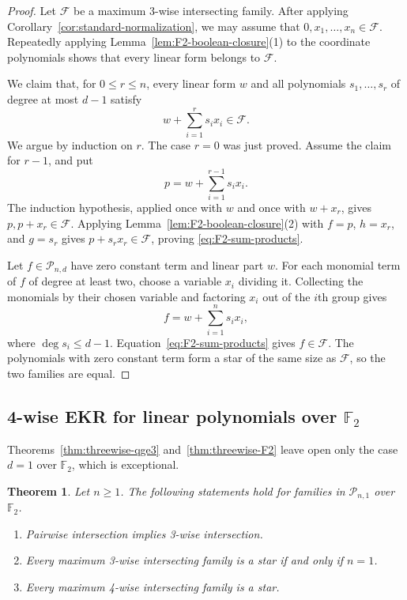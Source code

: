 \documentclass[12pt,reqno]{amsart}
\newtheorem{thm}{Theorem}[section]
\theoremstyle{definition}
\newcommand{\F}{\mathbb{F}}
\newcommand{\cF}{\mathcal F}
\newcommand{\cP}{\mathcal P}
\begin{document}
\begin{proof}
Let $\cF$ be a maximum 3-wise intersecting family. After applying
Corollary~\ref{cor:standard-normalization}, we may assume that
$0,x_1,\ldots,x_n\in\cF$. Repeatedly applying
Lemma~\ref{lem:F2-boolean-closure}\textup{(1)} to the coordinate
polynomials shows that every linear form belongs to $\cF$.

We claim that, for $0\leq r\leq n$, every linear form $w$ and all
polynomials $s_1,\ldots,s_r$ of degree at most $d-1$ satisfy
\begin{equation}\label{eq:F2-sum-products}
  w+\sum_{i=1}^r s_ix_i\in\cF.
\end{equation}
We argue by induction on $r$. The case $r=0$ was just proved. Assume
the claim for $r-1$, and put
\[
  p=w+\sum_{i=1}^{r-1}s_ix_i.
\]
The induction hypothesis, applied once with $w$ and once with
$w+x_r$, gives $p,p+x_r\in\cF$. Applying
Lemma~\ref{lem:F2-boolean-closure}\textup{(2)} with $f=p$, $h=x_r$,
and $g=s_r$ gives $p+s_rx_r\in\cF$, proving
\eqref{eq:F2-sum-products}.

Let $f\in\cP_{n,d}$ have zero constant term and linear part $w$. For each monomial term of $f$ of degree at least two, choose a variable $x_i$ dividing it. Collecting the monomials by their chosen variable and factoring $x_i$ out of the $i$th group gives
\[
  f=w+\sum_{i=1}^n s_ix_i,
\]
where $\deg s_i\leq d-1$. Equation~\eqref{eq:F2-sum-products} gives $f\in\cF$. The polynomials with zero constant term form a star of the same size as $\cF$, so the two families are equal.
\end{proof}

\subsection{4-wise EKR for linear polynomials over \texorpdfstring{$\F_2$}{F2}}
\label{subsec:affine-F2}

Theorems~\ref{thm:threewise-qge3} and~\ref{thm:threewise-F2} leave open only the case $d=1$ over $\F_2$, which is exceptional.

\begin{thm}\label{thm:affine-F2}
Let $n\geq1$. The following statements hold for families in $\cP_{n,1}$ over $\F_2$.
\begin{enumerate}[(1)]
\item Pairwise intersection implies 3-wise intersection.
\item Every maximum 3-wise intersecting family is a star if and only
if $n=1$.
\item Every maximum 4-wise intersecting family is a star.
\end{enumerate}
\end{thm}
\end{document}
